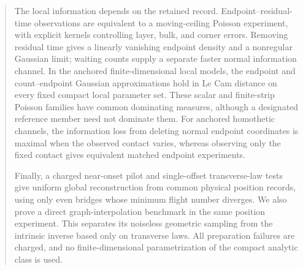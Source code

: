 \begin{abstract}
The local information depends on the retained record.  Endpoint--residual-time
observations are equivalent to a moving-ceiling Poisson experiment, with
explicit kernels controlling layer, bulk, and corner errors.  Removing
residual time gives a linearly vanishing endpoint density and a nonregular
Gaussian limit; waiting counts supply a separate faster normal information
channel.  In the anchored finite-dimensional local models, the endpoint and
count--endpoint Gaussian approximations hold in Le Cam distance on every
fixed compact local parameter set.  These scalar and finite-strip Poisson
families have common dominating measures, although a designated reference
member need not dominate them.  For anchored homothetic channels, the
information loss from deleting normal endpoint coordinates is maximal when
the observed contact varies, whereas observing only the fixed contact gives
equivalent matched endpoint experiments.

Finally, a charged near-onset pilot and single-offset transverse-law tests
give uniform global reconstruction from common physical position records,
using only even bridges whose minimum flight number diverges.  We also prove
a direct graph-interpolation benchmark in the same position experiment.
This separates its noiseless geometric sampling from the intrinsic inverse
based only on transverse laws.  All preparation failures are charged, and
no finite-dimensional parametrization of the compact analytic class is used.
\end{abstract}
\makeatletter
\def\@setabstracta{%
  \ifvoid\abstractbox\else
    \skip@20\p@ \advance\skip@-\lastskip
    \advance\skip@-\baselineskip \vskip\skip@
    \unvbox\abstractbox \prevdepth\z@
  \fi}
\makeatother
\maketitle
\setcounter{tocdepth}{1}
\tableofcontents










